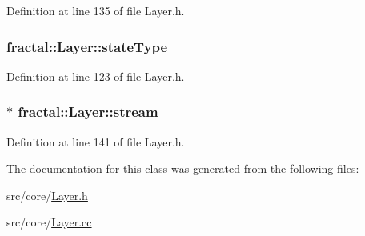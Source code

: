 Definition at line 135 of file Layer.\+h.

\hypertarget{classfractal_1_1Layer_a4f837fc5c1e649317ef534083ea24dfe}{
\subsubsection[{state\+Type}]{ fractal\+::\+Layer\+::state\+Type\hspace{0.3cm}{\ttfamily [protected]}}}\label{classfractal_1_1Layer_a4f837fc5c1e649317ef534083ea24dfe}


Definition at line 123 of file Layer.\+h.

\hypertarget{classfractal_1_1Layer_aef36108269bffa0d3ecbd67f190362fa}{
\subsubsection[{stream}]{$\ast$ fractal\+::\+Layer\+::stream\hspace{0.3cm}{\ttfamily [protected]}}}\label{classfractal_1_1Layer_aef36108269bffa0d3ecbd67f190362fa}


Definition at line 141 of file Layer.\+h.



The documentation for this class was generated from the following files\+:\begin{DoxyCompactItemize}
\item 
src/core/\hyperlink{Layer_8h}{Layer.\+h}\item 
src/core/\hyperlink{Layer_8cc}{Layer.\+cc}\end{DoxyCompactItemize}
